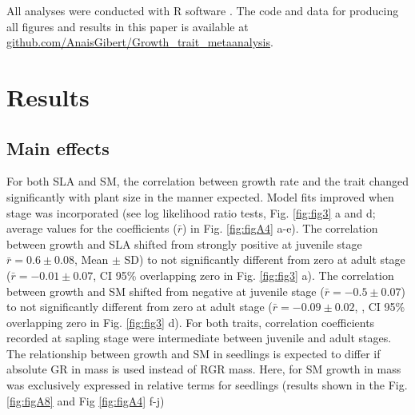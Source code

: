 \documentclass[a4paper,11pt]{article}
\newcommand{\smurl}[1]{\url{#1}}
\begin{document}
All analyses were conducted with R software \citep{Ralanguageanden:2014wf}. The code and data for producing all figures and results in this paper is available at \smurl{github.com/AnaisGibert/Growth\_trait\_metaanalysis}.

\section*{Results}\label{results}

\subsection*{Main effects}

For both SLA and SM, the correlation between growth rate and the trait changed significantly with plant size in the manner expected. Model fits improved when stage was incorporated (see log likelihood ratio tests, Fig. \ref{fig:fig3} a and d; average values for the coefficients ($\bar{r}$) in Fig. \ref{fig:figA4} a-e). The correlation between growth and SLA shifted from strongly positive at juvenile stage $\bar{r}=0.6 \pm 0.08$, Mean $\pm$ SD) to not significantly different from zero at adult stage ($\bar{r}= -0.01 \pm 0.07$, CI 95\% overlapping zero in Fig. \ref{fig:fig3} a). The correlation between growth and SM shifted from negative at juvenile stage ($\bar{r}= -0.5 \pm 0.07$) to not significantly different from zero at adult stage ($\bar{r}= -0.09 \pm 0.02$, , CI 95\% overlapping zero in Fig. \ref{fig:fig3} d). For both traits, correlation coefficients recorded at sapling stage were intermediate between juvenile and adult stages. The relationship between growth and SM in seedlings is expected to differ if absolute GR in mass is used instead of RGR mass. Here, for SM growth in mass was exclusively expressed in relative terms for seedlings (results shown in the Fig. \ref{fig:figA8} and Fig \ref{fig:figA4} f-j) 
\end{document}
